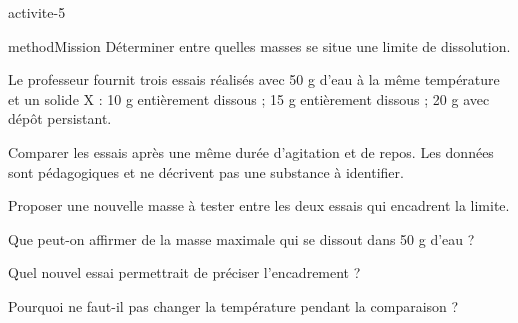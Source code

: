 \documentclass[12pt,twoside,openany]{book}
\begin{document}
\label{ch-5-activite}
\begin{pcFiche}{activite-5}
\begin{pcEncadre}{method}{Mission}
Déterminer entre quelles masses se situe une limite de dissolution.\par
\end{pcEncadre}
\begin{questions}
\item Le professeur fournit trois essais réalisés avec 50 g d’eau à la même température et un solide X : 10 g entièrement dissous ; 15 g entièrement dissous ; 20 g avec dépôt persistant.
\item Comparer les essais après une même durée d’agitation et de repos. Les données sont pédagogiques et ne décrivent pas une substance à identifier.
\item Proposer une nouvelle masse à tester entre les deux essais qui encadrent la limite.
\end{questions}
\begin{questions}
\item Que peut-on affirmer de la masse maximale qui se dissout dans 50 g d’eau ?
\item Quel nouvel essai permettrait de préciser l’encadrement ?
\item Pourquoi ne faut-il pas changer la température pendant la comparaison ?
\end{questions}
\end{pcFiche}
\label{ch-5-bilan}
\end{document}
